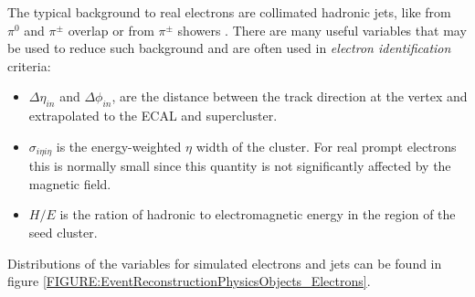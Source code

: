 The typical background to real electrons are collimated hadronic jets, like from $\pi^0$ and $\pi^{\pm}$ overlap or from $\pi^{\pm}$ showers \cite{ARTICLE:CMSElectronReconstruction}. There are many useful variables that may be used to reduce such background and are often used in \textit{electron identification} criteria:

\begin{itemize}
  \item $\Delta\eta_{in}$ and $\Delta\phi_{in}$, are the distance between the track direction at the vertex and extrapolated to the \gls{ECAL} and supercluster.
  \item $\sigma_{i \eta i \eta}$ is the energy-weighted $\eta$ width of the cluster. For real prompt electrons this is normally small since this quantity is not significantly affected by the magnetic field.
  \item $H/E$ is the ration of hadronic to electromagnetic energy in the region of the seed cluster. 
\end{itemize}

Distributions of the variables for simulated electrons and jets can be found in figure \ref{FIGURE:EventReconstructionPhysicsObjects_Electrons}. 

